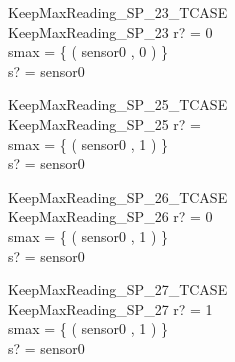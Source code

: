 \begin{schema}{KeepMaxReading\_SP\_23\_TCASE}\\
 KeepMaxReading\_SP\_23 
\where
 r? = 0 \\
 smax = \{ ( sensor0 , 0 ) \} \\
 s? = sensor0
\end{schema}


\begin{schema}{KeepMaxReading\_SP\_25\_TCASE}\\
 KeepMaxReading\_SP\_25 
\where
 r? =~ \\
 smax = \{ ( sensor0 , 1 ) \} \\
 s? = sensor0
\end{schema}


\begin{schema}{KeepMaxReading\_SP\_26\_TCASE}\\
 KeepMaxReading\_SP\_26 
\where
 r? = 0 \\
 smax = \{ ( sensor0 , 1 ) \} \\
 s? = sensor0
\end{schema}


\begin{schema}{KeepMaxReading\_SP\_27\_TCASE}\\
 KeepMaxReading\_SP\_27 
\where
 r? = 1 \\
 smax = \{ ( sensor0 , 1 ) \} \\
 s? = sensor0
\end{schema}


